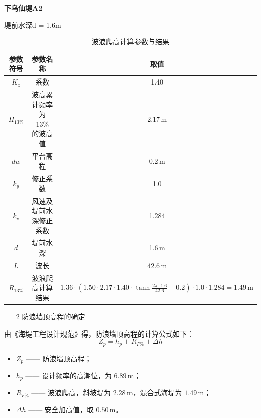\documentclass[UTF8, a4paper, 12pt]{ctexart} %
\begin{document}
\par

\textbf{下乌仙堤A2}

\par
堤前水深d = 1.6m
\par

\begin{table}[h]
    \centering
    \caption{波浪爬高计算参数与结果}
    \begin{tabular}{|c|c|c|}
        \hline
        参数符号 & 参数名称 & 取值 \\ \hline
        $K_z$ & 系数 & 1.40 \\ \hline
        $H_{13\%}$ & 波高累计频率为 13\% 的波高值 & 2.17\,m \\ \hline
        $dw$ & 平台高程 & 0.2\,m \\ \hline
        $k_y$ & 修正系数 & 1.0 \\ \hline
        $k_v$ & 风速及堤前水深修正系数 & 1.284 \\ \hline
        $d$ & 堤前水深 & 1.6\,m \\ \hline
        $L$ & 波长 & 42.6\,m \\ \hline
        $R_{13\%}$ & 波浪爬高计算结果 & $1.36 \cdot \left( 1.50 \cdot 2.17 \cdot 1.40 \cdot \tanh \frac{2 \pi \cdot 1.6}{42.6} - 0.2 \right) \cdot 1.0 \cdot 1.284 = 1.49\,\text{m}$ \\ \hline
    \end{tabular}
    \label{tab:wave_runup_calculation}
\end{table}



\newpage
\begin{itemize}
    \item [2] 防浪墙顶高程的确定
\end{itemize}
由《海堤工程设计规范》得，防浪墙顶高程的计算公式如下：
\begin{equation}
    Z_p = h_p + R_{F\%} + \Delta h
\end{equation}

\begin{itemize}
    \item $Z_p$ —— 防浪墙顶高程；
    \item $h_p$ —— 设计频率的高潮位，为 $6.89\,\text{m}$；
    \item $R_{F\%}$ —— 波浪爬高，斜坡堤为 $2.28\,\text{m}$，混合式海堤为 $1.49\,\text{m}$；
    \item $\Delta h$ —— 安全加高值，取 $0.50\,\text{m}$。
\end{itemize}
\end{document}
